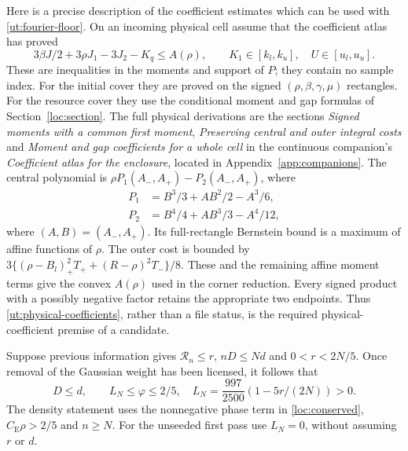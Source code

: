 \documentclass[aop,preprint]{imsart}
\theoremstyle{definition}
\newcommand{\CE}{C_{\mathrm E}}
\numberwithin{equation}{section}
\begin{document}
Here is a precise description of the coefficient estimates which can
be used with \eqref{ut:fourier-floor}. On an incoming physical cell
assume that the coefficient atlas has proved
\begin{equation}\label{ut:physical-coefficients}
 3\beta J/2+3\rho J_1-3J_2-K_q\le A(\rho),\qquad
 K_1\in[k_l,k_u],\quad U\in[u_l,u_u].
\end{equation}
These are inequalities in the moments and support of $P$; they contain
no sample index. For the initial cover they are proved on the signed
$(\rho,\beta,\gamma,\mu)$ rectangles. For the resource cover they use
the conditional moment and gap formulas of Section~\ref{loc:section}.
The full physical derivations are the sections \emph{Signed moments
with a common first moment}, \emph{Preserving central and outer
integral costs} and \emph{Moment and gap coefficients for a whole
cell} in the continuous companion's \emph{Coefficient atlas for the
enclosure}, located in Appendix~\ref{app:companions}.
The central polynomial is $\rho P_1(A_-,A_+)-P_2(A_-,A_+)$, where
\begin{align*}
 P_1&=B^3/3+AB^2/2-A^3/6,\\
 P_2&=B^4/4+AB^3/3-A^4/12,
\end{align*}
where $(A,B)=(A_-,A_+)$.
Its full-rectangle Bernstein bound is a maximum of affine functions
of $\rho$. The outer cost is bounded by
$3\{(\rho-B_l)_+^2T_++(R-\rho)^2T_-\}/8$.
These and the remaining affine moment terms give the convex
$A(\rho)$ used in the corner reduction. Every signed product with
a possibly negative factor retains the appropriate two endpoints.
Thus \eqref{ut:physical-coefficients}, rather than a file status, is
the required physical-coefficient premise of a candidate.

Suppose previous information gives
$\mathcal R_n\le r$, $nD\le Nd$ and $0<r<2N/5$.
Once removal of the Gaussian weight has been licensed, it follows that
\begin{equation}\label{ut:incoming-envelope}
 D\le d,\qquad L_N\le\varphi\le2/5,\quad
 L_N=\frac{997}{2500}(1-5r/(2N))>0.
\end{equation}
The density statement uses the nonnegative phase term in
\eqref{loc:conserved}, $\CE\rho>2/5$ and $n\ge N$.
For the unseeded first pass use $L_N=0$, without assuming $r$ or $d$.
\end{document}
